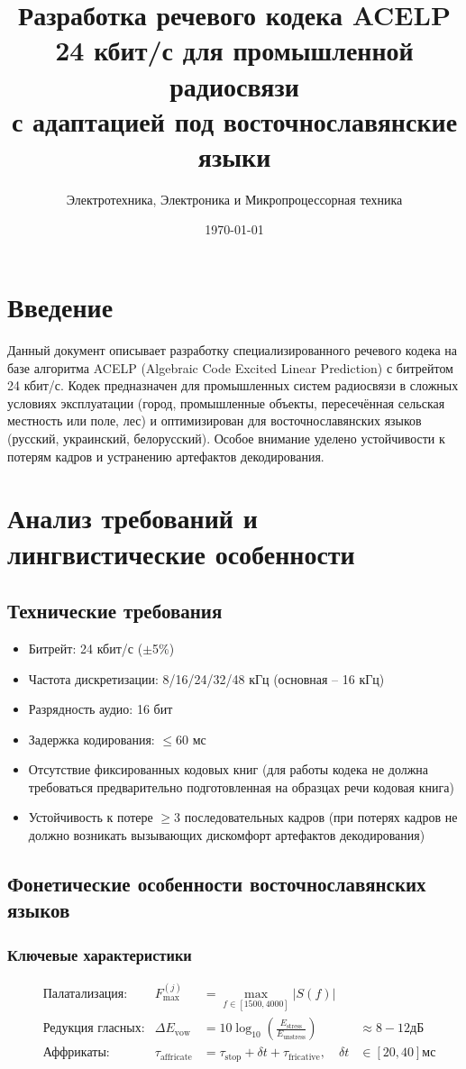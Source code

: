 \documentclass{report}
\title{Разработка речевого кодека ACELP 24 кбит/с для промышленной радиосвязи\\ с адаптацией под восточнославянские языки}
\author{Электротехника, Электроника и Микропроцессорная техника}
\date{\today}
\begin{document}
	
	\maketitle
	
	\tableofcontents
	
	\chapter*{Введение}
	Данный документ описывает разработку специализированного речевого кодека на базе алгоритма ACELP (Algebraic Code Excited Linear Prediction) с битрейтом 24 кбит/с. Кодек предназначен для промышленных систем радиосвязи в сложных условиях эксплуатации (город, промышленные объекты, пересечённая сельская местность или поле, лес) и оптимизирован для восточнославянских языков (русский, украинский, белорусский). Особое внимание уделено устойчивости к потерям кадров и устранению артефактов декодирования.
	
	\chapter{Анализ требований и лингвистические особенности}
	\section{Технические требования}
	\begin{itemize}
		\item Битрейт: 24 кбит/с ($\pm$5\%)
		\item Частота дискретизации: 8/16/24/32/48 кГц (основная -- 16 кГц)
		\item Разрядность аудио: 16 бит
		\item Задержка кодирования: $\leqslant$60 мс
		\item Отсутствие фиксированных кодовых книг (для работы кодека не должна требоваться предварительно подготовленная на образцах речи кодовая книга)
		\item Устойчивость к потере $\geqslant$3 последовательных кадров (при потерях кадров не должно возникать вызывающих дискомфорт артефактов декодирования)
	\end{itemize}
	
	\section{Фонетические особенности восточнославянских языков}
	\subsection{Ключевые характеристики}
	\begin{align}
		&\text{Палатализация:} & F_{\text{max}}^{(j)} &= \max_{f \in [1500,4000]} |S(f)| \\
		&\text{Редукция гласных:} & \Delta E_{\text{vow}} &= 10 \log_{10} \left( \frac{E_{\text{stress}}}{E_{\text{unstress}}} \right) &\approx 8-12 \text{дБ} \\
		&\text{Аффрикаты:} & \tau_{\text{affricate}} &= \tau_{\text{stop}} + \delta t + \tau_{\text{fricative}}, \quad \delta t &\in [20,40] \text{мс}
	\end{align}
	
\end{document}

